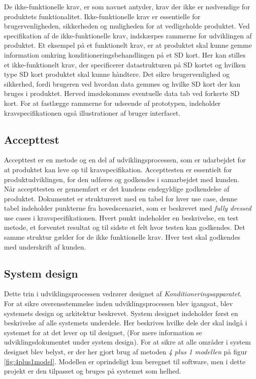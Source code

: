	De ikke-funktionelle krav, er som navnet antyder, krav der ikke er nødvendige for produktets funktionalitet. Ikke-funktionelle krav er essentielle for brugervenligheden, sikkerheden og muligheden for at vedligeholde produktet. Ved specifikation af de ikke-funktionelle krav, indskærpes rammerne for udviklingen af produktet. Et eksempel på et funktionelt krav, er at produktet skal kunne gemme information omkring konditioneringsbehandlingen på et SD kort. Her kan stilles et ikke-funktionelt krav, der specificerer datastrukturen på SD kortet og hvilken type SD kort produktet skal kunne håndtere. Det sikre brugervenlighed og sikkerhed, fordi brugeren ved hvordan data gemmes og hvilke SD kort der kan bruges i produktet. Herved imødekommes eventuelle data tab ved forkerte SD kort. For at fastlægge rammerne for udseende af prototypen, indeholder kravspecifikationen også illustrationer af bruger interfacet. 
	
	\subsection{Accepttest} \label{title:accepttest}
	Accepttest er en metode og en del af udviklingsprocessen, som er udarbejdet for at produktet kan leve op til kravspecifikation. Accepttesten er essentielt for produktudviklingen, for den udføres og godkendes i samarbejdet med kunden. Når accepttesten er gennemført er det kundens endegyldige godkendelse af produktet. 
	Dokumentet er struktureret med en tabel for hver use case, denne tabel indeholder punkterne fra hovedscenariet, som er beskrevet med \textit{fully dressed} use cases i kravspecifikationen. Hvert punkt indeholder en beskrivelse, en test metode, et forventet resultat og til sidste et felt hvor testen kan godkendes. Det samme struktur gælder for de ikke funktionelle krav. Hver test skal godkendes med underskrift af kunden.
	
	\subsection{System design} \label{title:systemdesign}
	Dette trin i udviklingsprocessen vedrører designet af \textit{Konditioneringsapparatet}. For at sikre overensstemmelse inden udviklingsprocessen blev igangsat, blev systemets design og arkitektur beskrevet. System designet indeholder først en beskrivelse af alle systemets underdele. Her beskrives hvilke dele der skal indgå i systemet for at det lever op til designet, (For mere information se udviklingsdokumentet under system design).
	For at sikre at alle områder i system designet blev belyst, er der her gjort brug af metoden \textit{4 plus 1 modellen} på figur \ref{fig:4plus1model}. Modellen er oprindeligt kun beregnet til software, men i dette projekt er den tilpasset og bruges på systemet som helhed. 
	

